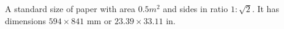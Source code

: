 A standard size of paper with area $0.5m^{2}$  and sides in ratio
$1 : \sqrt{2}$. It has dimensions $594 \times 841$ mm or $23.39 \times 33.11$ in.